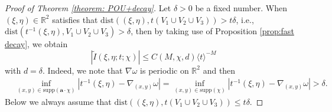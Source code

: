 \documentclass[12pt]{amsart}
\newtheorem{remark}{Remark}
\newcommand\JP[1]{\langle#1\rangle}
\newcommand{\R}{\mathbb{R}}
\begin{document}
\begin{proof}[Proof of Theorem \ref{theorem: POU+decay}]
    Let $\delta>0$ be a fixed number. When $\left(\xi,\eta\right)\in\R^{2}$ satisfies that $\mathrm{dist}\left(\left(\xi,\eta\right),t\left(V_{1}\cup V_{2}\cup V_{3}\right)\right)>t\delta$, i.e., $\mathrm{dist}\left(t^{-1}\left(\xi,\eta\right),V_{1}\cup V_{2}\cup V_{3}\right)>\delta$, then by taking use of Proposition \ref{prop:fast decay}, we obtain
    \begin{equation*}
        \left|\widetilde{I}\left(\xi,\eta;t;\chi\right)\right|\leq C\left(M,\chi,d\right)\JP{t}^{-M}
    \end{equation*}
    with $d=\delta$. Indeed, we note that $\nabla\omega$ is periodic on $\R^{2}$ and then
    \begin{equation*}
        \begin{aligned}
            &\inf_{\left(x,y\right)\in\mathrm{supp}\left(\mathbf{a}\cdot\chi\right)}\left|t^{-1}\left(\xi,\eta\right)-\nabla_{\left(x,y\right)}\omega\right|=\inf_{\left(x,y\right)\in\mathrm{supp}\left(\chi\right)}\left|t^{-1}\left(\xi,\eta\right)-\nabla_{\left(x,y\right)}\omega\right|>\delta.
        \end{aligned}
    \end{equation*}
    Below we always assume that $\mathrm{dist}\left(\left(\xi,\eta\right),t\left(V_{1}\cup V_{2}\cup V_{3}\right)\right)\leq t\delta$. 
    

\end{proof}
\end{document}
